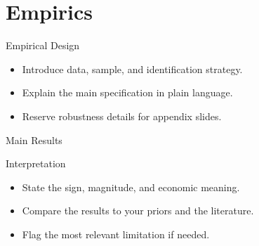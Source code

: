 \section{Empirics}

\begin{frame}{Empirical Design}
  \begin{itemize}
    \item Introduce data, sample, and identification strategy.
    \item Explain the main specification in plain language.
    \item Reserve robustness details for appendix slides.
  \end{itemize}
\end{frame}

\begin{frame}{Main Results}
  
\end{frame}

\begin{frame}{Interpretation}
  \begin{itemize}
    \item State the sign, magnitude, and economic meaning.
    \item Compare the results to your priors and the literature.
    \item Flag the most relevant limitation if needed.
  \end{itemize}
\end{frame}
